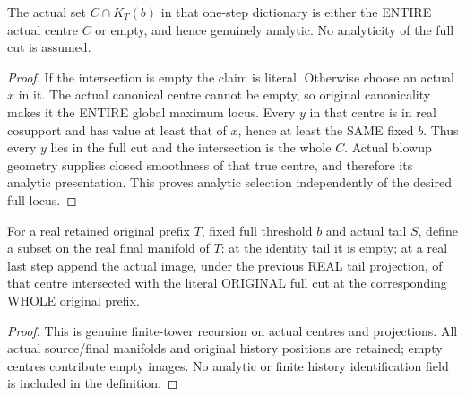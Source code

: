 \begin{lemma}
\label{hir:original-canonical-threshold-selected-centre-analytic}
\leanok
The actual set $C\cap K_T(b)$ in that one-step dictionary is either the
ENTIRE actual centre $C$ or empty, and hence genuinely analytic.
No analyticity of the full cut is assumed.
\end{lemma}
\begin{proof}
If the intersection is empty the claim is literal. Otherwise choose an
actual $x$ in it. The actual canonical centre cannot be empty, so original
canonicality makes it the ENTIRE global maximum locus. Every $y$ in that
centre is in real cosupport and has value at least that of $x$, hence at
least the SAME fixed $b$. Thus every $y$ lies in the full cut and the
intersection is the whole $C$. Actual blowup geometry supplies closed
smoothness of that true centre, and therefore its analytic presentation.
This proves analytic selection independently of the desired full locus.
\end{proof}

\begin{definition}
\label{hir:original-finite-selected-centre-image-objects}
\leanok
For a real retained original prefix $T$, fixed full threshold $b$ and actual
tail $S$, define a subset on the real final manifold of $T$: at the identity
tail it is empty; at a real last step append the actual image, under the
previous REAL tail projection, of that centre intersected with the literal
ORIGINAL full cut at the corresponding WHOLE original prefix.
\end{definition}
\begin{proof}
This is genuine finite-tower recursion on actual centres and projections.
All actual source/final manifolds and original history positions are
retained; empty centres contribute empty images. No analytic or finite
history identification field is included in the definition.
\end{proof}

